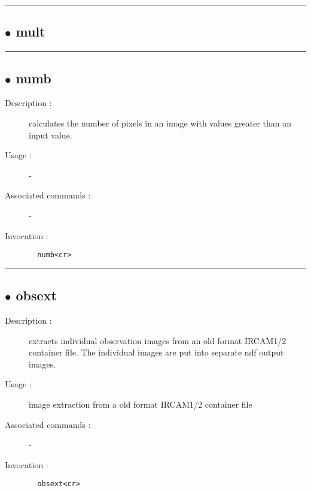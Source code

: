 \hrule \subsection*{$\bullet$ mult}

\hrule \subsection*{$\bullet$ numb}
\begin{description}
\item[Description :] calculates the number of pixels in an image with values greater
than an input value.
\item[Usage :] -
\item[Associated commands :] -
\item[Invocation :]

\verb+  numb<cr> +\end{description}

\hrule \subsection*{$\bullet$ obsext}
\begin{description}
\item[Description :] extracts individual observation images from an old format
{\sc IRCAM1/2} container file.  The individual images are put into separate
ndf output images.
\item[Usage :] image extraction from a old format {\sc IRCAM1/2} container file
\item[Associated commands :] -
\item[Invocation :]

\verb+  obsext<cr> +\end{description}

